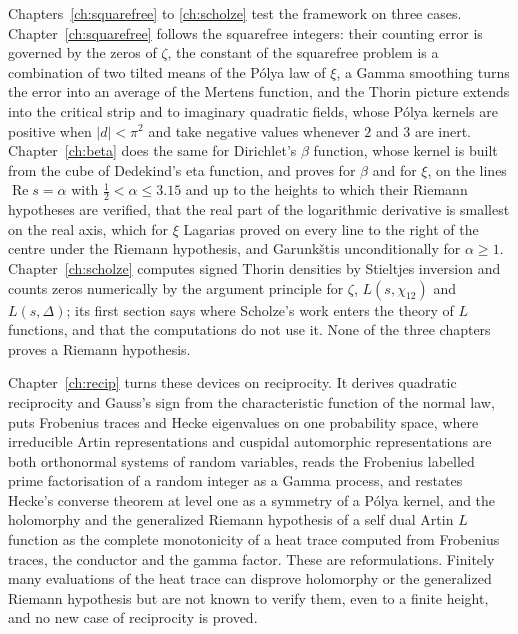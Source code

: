 Chapters~\ref{ch:squarefree} to \ref{ch:scholze} test the framework on three cases. Chapter~\ref{ch:squarefree} follows the squarefree integers: their counting error is governed by the zeros of $\zeta$, the constant of the squarefree problem is a combination of two tilted means of the P\'olya law of $\xi$, a Gamma smoothing turns the error into an average of the Mertens function, and the Thorin picture extends into the critical strip and to imaginary quadratic fields, whose P\'olya kernels are positive when $|d|<\pi^2$ and take negative values whenever $2$ and $3$ are inert. Chapter~\ref{ch:beta} does the same for Dirichlet's $\beta$ function, whose kernel is built from the cube of Dedekind's eta function, and proves for $\beta$ and for $\xi$, on the lines $\operatorname{Re}s=\alpha$ with $\frac12<\alpha\le3.15$ and up to the heights to which their Riemann hypotheses are verified, that the real part of the logarithmic derivative is smallest on the real axis, which for $\xi$ Lagarias proved on every line to the right of the centre under the Riemann hypothesis, and Garunk\v{s}tis unconditionally for $\alpha\ge1$. Chapter~\ref{ch:scholze} computes signed Thorin densities by Stieltjes inversion and counts zeros numerically by the argument principle for $\zeta$, $L(s,\chi_{12})$ and $L(s,\Delta)$; its first section says where Scholze's work enters the theory of $L$ functions, and that the computations do not use it. None of the three chapters proves a Riemann hypothesis.

Chapter~\ref{ch:recip} turns these devices on reciprocity. It derives quadratic reciprocity and Gauss's sign from the characteristic function of the normal law, puts Frobenius traces and Hecke eigenvalues on one probability space, where irreducible Artin representations and cuspidal automorphic representations are both orthonormal systems of random variables, reads the Frobenius labelled prime factorisation of a random integer as a Gamma process, and restates Hecke's converse theorem at level one as a symmetry of a P\'olya kernel, and the holomorphy and the generalized Riemann hypothesis of a self dual Artin $L$ function as the complete monotonicity of a heat trace computed from Frobenius traces, the conductor and the gamma factor. These are reformulations. Finitely many evaluations of the heat trace can disprove holomorphy or the generalized Riemann hypothesis but are not known to verify them, even to a finite height, and no new case of reciprocity is proved.

